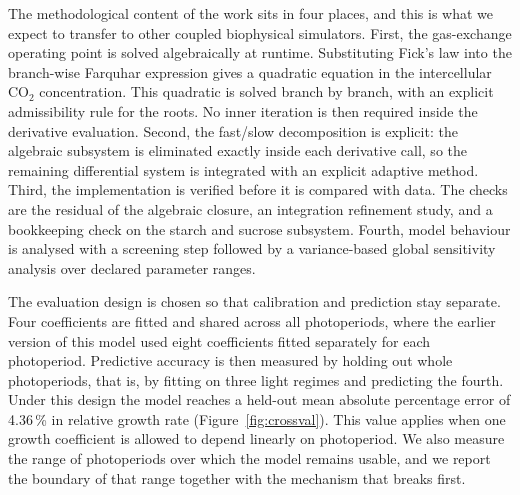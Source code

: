 The methodological content of the work sits in four places, and this is what we
expect to transfer to other coupled biophysical simulators. First, the
gas-exchange operating point is solved algebraically at runtime. Substituting
Fick's law into the branch-wise Farquhar expression gives a quadratic equation
in the intercellular CO$_2$ concentration. This quadratic is solved branch by
branch, with an explicit admissibility rule for the roots. No inner iteration
is then required inside the derivative evaluation. Second, the fast/slow decomposition
is explicit: the algebraic subsystem is eliminated exactly inside each
derivative call, so the remaining differential system is integrated with an
explicit adaptive method. Third, the implementation is verified before it is
compared with data. The checks are the residual of the algebraic closure, an
integration refinement study, and a bookkeeping check on the starch and sucrose
subsystem.
Fourth, model behaviour is analysed with a screening step followed by a
variance-based global sensitivity analysis over declared parameter ranges.

The evaluation design is chosen so that calibration and prediction stay
separate. Four coefficients are fitted and shared across all photoperiods,
where the earlier version of this model used eight coefficients fitted
separately for each photoperiod. Predictive accuracy is then measured by
holding out whole photoperiods, that is, by fitting on three light regimes and
predicting the fourth. Under this design the model reaches a held-out mean
absolute percentage error of 4.36\,\% in relative growth rate
(Figure~\ref{fig:crossval}). This value applies when one growth coefficient is
allowed to depend linearly on photoperiod. We also measure the
range of photoperiods over which the model remains usable, and we report the
boundary of that range together with the mechanism that breaks first.


